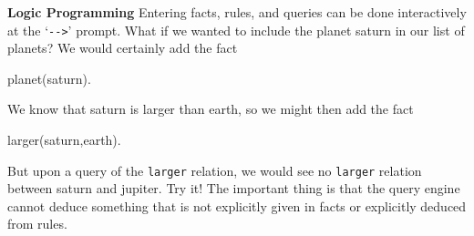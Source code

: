 \begin{minipage}[t]{\sw}
\slidenumber
\LARGE
{\bf Logic Programming}\exx
Entering facts, rules, and queries can be done interactively
at the `\verb'-->'' prompt.\exx
What if we wanted to include the planet saturn in our list of planets?
We would certainly add the fact
{\Large
\begin{qv}
planet(saturn).
\end{qv}
}
We know that saturn is larger than earth, so we might then add the fact
{\Large
\begin{qv}
larger(saturn,earth).
\end{qv}
}
But upon a query of the \verb'larger' relation,
we would see no \verb'larger' relation between saturn and jupiter.
Try it!\exx
The important thing is that the query engine
cannot deduce something that is not explicitly given in facts
or explicitly deduced from rules.
\end{minipage}
